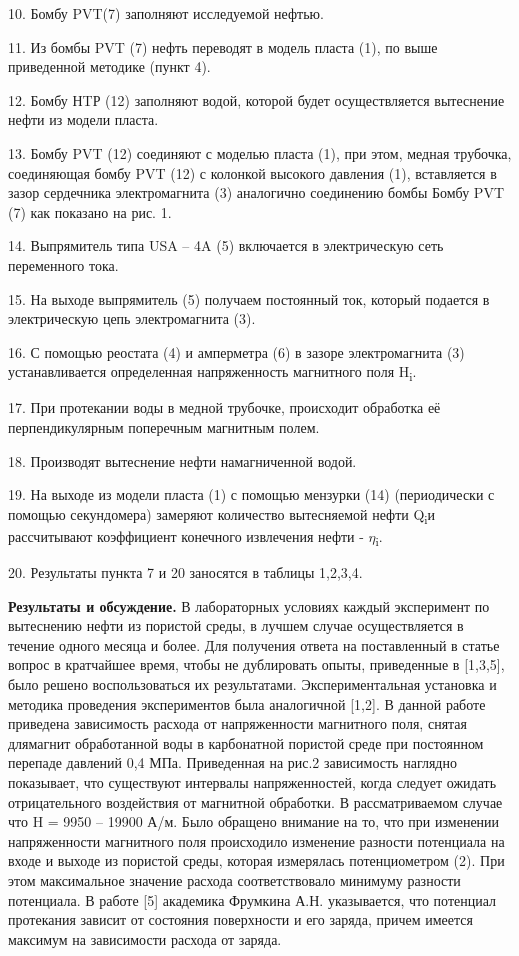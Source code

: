 {{10. Бомбу PVT(7) заполняют исследуемой нефтью.

11. Из бомбы PVT (7) нефть переводят в модель пласта (1), по выше
приведенной методике (пункт 4).

12. Бомбу НTР (12) заполняют водой, которой будет осуществляется
вытеснение нефти из модели пласта.

13. Бомбу PVT (12) соединяют с моделью пласта (1), при этом, медная
трубочка, соединяющая бомбу PVT (12) с колонкой высокого давления (1),
вставляется в зазор сердечника электромагнита (3) аналогично соединению
бомбы Бомбу PVT (7) как показано на рис. 1.

14. Выпрямитель типа USA -- 4A (5) включается в электрическую сеть
переменного тока.

15. На выходе выпрямитель (5) получаем постоянный ток, который подается
в электрическую цепь электромагнита (3).

16. С помощью реостата (4) и амперметра (6) в зазоре электромагнита (3)
устанавливается определенная напряженность магнитного поля
H\textsubscript{i}.

17. При протекании воды в медной трубочке, происходит обработка её
перпендикулярным поперечным магнитным полем.

18. Производят вытеснение нефти намагниченной водой.

19. На выходе из модели пласта (1) с помощью мензурки (14) (периодически
с помощью секундомера) замеряют количество вытесняемой нефти
Q\textsubscript{i}и рассчитывают коэффициент конечного извлечения нефти
- \(\eta\)\textsubscript{i}.

20. Результаты пункта 7 и 20 заносятся в таблицы 1,2,3,4.

{\bfseries Результаты и обсуждение.} В лабораторных условиях каждый
эксперимент по вытеснению нефти из пористой среды, в лучшем случае
осуществляется в течение одного месяца и более. Для получения ответа на
поставленный в статье вопрос в кратчайшее время, чтобы не дублировать
опыты, приведенные в {[}1,3,5{]}, было решено воспользоваться их
результатами. Экспериментальная установка и методика проведения
экспериментов была аналогичной {[}1,2{]}. В данной работе приведена
зависимость расхода от напряженности магнитного поля, снятая длямагнит
обработанной воды в карбонатной пористой среде при постоянном перепаде
давлений 0,4 МПа. Приведенная на рис.2 зависимость наглядно показывает,
что существуют интервалы напряженностей, когда следует ожидать
отрицательного воздействия от магнитной обработки. В рассматриваемом
случае что H = 9950 -- 19900 А/м. Было обращено внимание на то, что при
изменении напряженности магнитного поля происходило изменение разности
потенциала на входе и выходе из пористой среды, которая измерялась
потенциометром (2). При этом максимальное значение расхода
соответствовало минимуму разности потенциала. В работе {[}5{]} академика
Фрумкина А.Н. указывается, что потенциал протекания зависит от состояния
поверхности и его заряда, причем имеется максимум на зависимости расхода
от заряда.

}}
